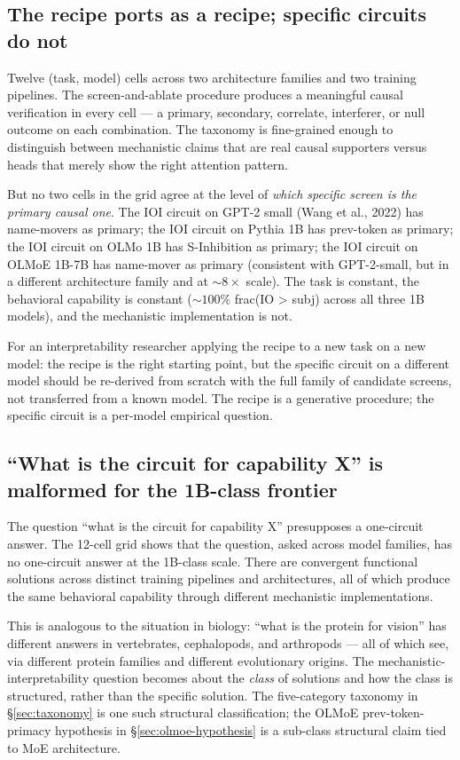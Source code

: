 \documentclass[11pt]{article}
\begin{document}
\subsection{The recipe ports as a recipe; specific circuits do not}

Twelve (task, model) cells across two architecture families and two training pipelines. The screen-and-ablate procedure produces a meaningful causal verification in every cell --- a primary, secondary, correlate, interferer, or null outcome on each combination. The taxonomy is fine-grained enough to distinguish between mechanistic claims that are real causal supporters versus heads that merely show the right attention pattern.

But no two cells in the grid agree at the level of \emph{which specific screen is the primary causal one}. The IOI circuit on GPT-2 small (Wang et al., 2022) has name-movers as primary; the IOI circuit on Pythia 1B has prev-token as primary; the IOI circuit on OLMo 1B has S-Inhibition as primary; the IOI circuit on OLMoE 1B-7B has name-mover as primary (consistent with GPT-2-small, but in a different architecture family and at $\sim 8\times$ scale). The task is constant, the behavioral capability is constant ($\sim 100\%$ frac(IO > subj) across all three 1B models), and the mechanistic implementation is not.

For an interpretability researcher applying the recipe to a new task on a new model: the recipe is the right starting point, but the specific circuit on a different model should be re-derived from scratch with the full family of candidate screens, not transferred from a known model. The recipe is a generative procedure; the specific circuit is a per-model empirical question.

\subsection{``What is the circuit for capability X'' is malformed for the 1B-class frontier}

The question ``what is the circuit for capability X'' presupposes a one-circuit answer. The 12-cell grid shows that the question, asked across model families, has no one-circuit answer at the 1B-class scale. There are convergent functional solutions across distinct training pipelines and architectures, all of which produce the same behavioral capability through different mechanistic implementations.

This is analogous to the situation in biology: ``what is the protein for vision'' has different answers in vertebrates, cephalopods, and arthropods --- all of which see, via different protein families and different evolutionary origins. The mechanistic-interpretability question becomes about the \emph{class} of solutions and how the class is structured, rather than the specific solution. The five-category taxonomy in \S\ref{sec:taxonomy} is one such structural classification; the OLMoE prev-token-primacy hypothesis in \S\ref{sec:olmoe-hypothesis} is a sub-class structural claim tied to MoE architecture.
\end{document}
